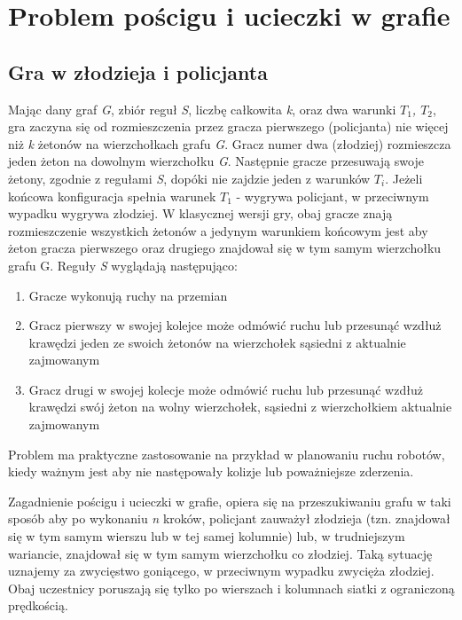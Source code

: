 \documentclass[brudnopis]{xmgr}
\begin{document}
\chapter{Problem pościgu i ucieczki w grafie}
\section{Gra w złodzieja i policjanta}
Mając dany graf \textit{G}, zbiór reguł \textit{S}, liczbę całkowita \textit{k}, oraz dwa warunki \textit{$T_1$, $T_2$}, gra zaczyna się od rozmieszczenia przez gracza pierwszego (policjanta) nie więcej niż \textit{k} żetonów na wierzchołkach grafu \textit{G}. Gracz numer dwa (złodziej) rozmieszcza jeden żeton na dowolnym wierzchołku \textit{G}. Następnie gracze przesuwają swoje żetony, zgodnie z regułami \textit{S}, dopóki nie zajdzie jeden z warunków $T_i$. Jeżeli końcowa konfiguracja spełnia warunek $T_1$ - wygrywa policjant, w przeciwnym wypadku wygrywa złodziej. W klasycznej wersji gry, obaj gracze znają rozmieszczenie wszystkich żetonów a jedynym warunkiem końcowym jest aby żeton gracza pierwszego oraz drugiego znajdował się w tym samym wierzchołku grafu G.
Reguły \textit{S} wyglądają następująco:
\begin{enumerate}
  \item Gracze wykonują ruchy na przemian
  \item Gracz pierwszy w swojej kolejce może odmówić ruchu lub przesunąć wzdłuż krawędzi jeden ze swoich żetonów na wierzchołek sąsiedni z aktualnie zajmowanym
  \item Gracz drugi w swojej kolecje może odmówić ruchu lub przesunąć wzdłuż krawędzi swój żeton na wolny wierzchołek, sąsiedni z wierzchołkiem aktualnie zajmowanym
\end{enumerate}

Problem ma praktyczne zastosowanie na przykład w planowaniu ruchu robotów, kiedy ważnym jest aby nie następowały kolizje lub poważniejsze zderzenia.

Zagadnienie pościgu i ucieczki w grafie, opiera się na przeszukiwaniu grafu w taki sposób aby po wykonaniu \textit{n} kroków, policjant zauważył złodzieja (tzn. znajdował się w tym samym wierszu lub w tej samej kolumnie) lub, w trudniejszym wariancie, znajdował się w tym samym wierzchołku co złodziej. Taką sytuację uznajemy za zwycięstwo goniącego, w przeciwnym wypadku zwycięża złodziej. Obaj uczestnicy poruszają się tylko po wierszach i kolumnach siatki z ograniczoną prędkością.
\end{document}
